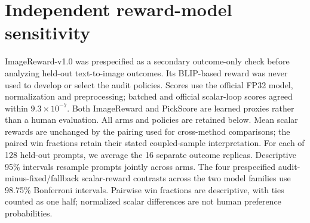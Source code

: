 \section{Independent reward-model sensitivity}
\label{supp:imagereward}
ImageReward-v1.0\cite{xu2023imagereward} was prespecified as a secondary outcome-only check before analyzing held-out text-to-image outcomes. Its BLIP-based reward was never used to develop or select the audit policies. Scores use the official FP32 model, normalization and preprocessing; batched and official scalar-loop scores agreed within $9.3\times10^{-7}$. Both ImageReward and PickScore are learned proxies rather than a human evaluation. All arms and policies are retained below. Mean scalar rewards are unchanged
by the pairing used for cross-method comparisons; the paired win fractions
retain their stated coupled-sample interpretation.
For each of 128 held-out prompts, we average the 16 separate outcome replicas. Descriptive 95\% intervals resample prompts jointly across arms. The four prespecified audit-minus-fixed/fallback scalar-reward contrasts across the two model families use 98.75\% Bonferroni intervals. Pairwise win fractions are descriptive, with ties counted as one half; normalized scalar differences are not human preference probabilities.
